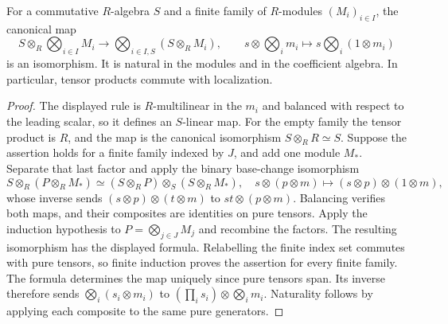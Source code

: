 \begin{lemma}
\label{lem:tensor-base-change-equivalence}
\leanok
For a commutative $R$-algebra $S$ and a finite family of $R$-modules
$(M_i)_{i\in I}$, the canonical map
\[
 S\otimes_R\bigotimes_{i\in I}M_i\longrightarrow
 \bigotimes_{i\in I,S}(S\otimes_R M_i),\qquad
 s\otimes\bigotimes_i m_i\longmapsto
 s\bigotimes_i(1\otimes m_i)
\]
is an isomorphism. It is natural in the modules and in the coefficient
algebra. In particular, tensor products commute with localization.
\end{lemma}
\begin{proof}
The displayed rule is $R$-multilinear in the $m_i$ and balanced with
respect to the leading scalar, so it defines an $S$-linear map.
For the empty family the tensor product is $R$, and the map is the
canonical isomorphism $S\otimes_R R\simeq S$.
Suppose the assertion holds for a finite family indexed by $J$, and
add one module $M_*$. Separate that last factor and apply the binary
base-change isomorphism
\[
 S\otimes_R(P\otimes_R M_*)\simeq
 (S\otimes_R P)\otimes_S(S\otimes_R M_*),
 \quad s\otimes(p\otimes m)\mapsto(s\otimes p)\otimes(1\otimes m),
\]
whose inverse sends $(s\otimes p)\otimes(t\otimes m)$ to
$st\otimes(p\otimes m)$. Balancing verifies both maps, and their
composites are identities on pure tensors. Apply the induction
hypothesis to $P=\bigotimes_{j\in J}M_j$ and recombine the factors.
The resulting isomorphism has the displayed formula. Relabelling the
finite index set commutes with pure tensors, so finite induction proves
the assertion for every finite family. The formula determines the map
uniquely since pure tensors span. Its inverse therefore sends
$\bigotimes_i(s_i\otimes m_i)$ to
$(\prod_i s_i)\otimes\bigotimes_i m_i$.
Naturality follows by applying each composite to the same pure generators.
\end{proof}


